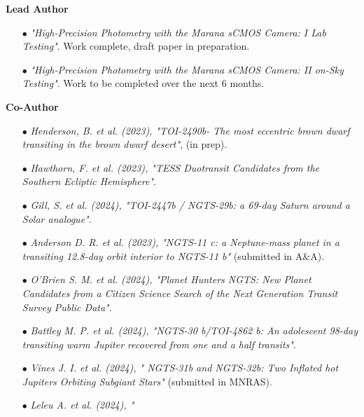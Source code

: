 \documentclass[10pt]{article}
\begin{document}
\textbf{\large{Lead Author}}
\\[-0.6cm]
\begin{itemize}[itemsep = -0.75 mm, leftmargin=*]
    \item[{\color[RGB]{10,0,254}$\bullet$}] \noindent \textit{"High-Precision Photometry with the Marana sCMOS Camera: I Lab Testing"}. Work complete, draft paper in preparation.
    \item[{\color[RGB]{10,0,254}$\bullet$}] \noindent \textit{"High-Precision Photometry with the Marana sCMOS Camera: II on-Sky Testing"}.  Work to be completed over the next 6 months.
\end{itemize}
\vspace{-2pt}
\textbf{\large{Co-Author}}  
\\[-0.6cm]
\begin{itemize}[itemsep = -0.75 mm, leftmargin=*]
    \item[{\color[RGB]{10,0,254}$\bullet$}] \noindent \textit{Henderson, B. et al. (2023),  "TOI-2490b- The most eccentric brown dwarf transiting in the brown dwarf desert"}, (in prep).
    \item[{\color[RGB]{10,0,254}$\bullet$}] \noindent \textit{Hawthorn, F. et al. (2023), "TESS Duotransit Candidates from the Southern Ecliptic Hemisphere"}.
    \item[{\color[RGB]{10,0,254}$\bullet$}] \noindent \textit{Gill, S. et al. (2024), "TOI-2447b / NGTS-29b: a 69-day Saturn around a Solar analogue"}.
    \item[{\color[RGB]{10,0,254}$\bullet$}] \noindent \textit{Anderson D. R. et al. (2023), "NGTS-11 c: a Neptune-mass planet in a transiting 12.8-day orbit interior to NGTS-11 b"} (submitted in A\&A).
    \item[{\color[RGB]{10,0,254}$\bullet$}] \noindent \textit{O'Brien S. M. et al. (2024), "Planet Hunters NGTS: New Planet Candidates from a Citizen Science Search of the Next Generation Transit Survey Public Data"}.
    \item[{\color[RGB]{10,0,254}$\bullet$}] \noindent \textit{Battley M. P. et al. (2024), "NGTS-30 b/TOI-4862 b: An adolescent 98-day transiting warm Jupiter recovered from one and a half transits"}.
    \item[{\color[RGB]{10,0,254}$\bullet$}] \noindent \textit{Vines J. I. et al. (2024), "
    NGTS-31b and NGTS-32b: Two Inflated hot Jupiters Orbiting Subgiant Stars"} (submitted in MNRAS).
    \item[{\color[RGB]{10,0,254}$\bullet$}] \noindent \textit{Leleu A. et al. (2024), "
}
\end{itemize}
\end{document}
